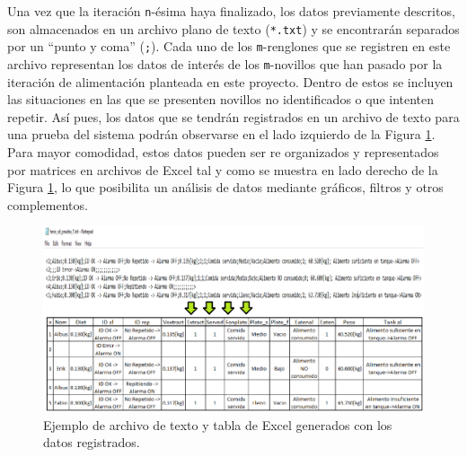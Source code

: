 Una vez que la iteración \texttt{n}-ésima haya finalizado, los datos previamente descritos, son almacenados en un archivo plano de texto (\texttt{*.txt}) y se encontrarán separados por un ``punto y coma'' (\texttt{;}).
Cada uno de los \texttt{m}-renglones que se registren en este archivo representan los datos de interés de los \texttt{m}-novillos que han pasado por la iteración de alimentación planteada en este proyecto. Dentro de estos se incluyen las situaciones en las que se presenten novillos no identificados o que intenten repetir.
Así pues, los datos que se tendrán registrados en un archivo de texto para una prueba del sistema podrán observarse en el lado izquierdo de la Figura \ref{sdtxtpng}.
Para mayor comodidad, estos datos pueden ser re organizados y representados por matrices en archivos de Excel tal y como se muestra en lado derecho de la Figura \ref{sdtxtpng}, lo que posibilita un análisis de datos mediante gráficos, filtros y otros complementos.


\begin{figure}[H]
	\begin{center}
		\includegraphics[scale=0.52,angle=90]{img/sdtxt.png}
	\end{center}
	\caption{Ejemplo de archivo de texto y tabla de Excel generados con los datos registrados.}\label{sdtxtpng}
\end{figure}



